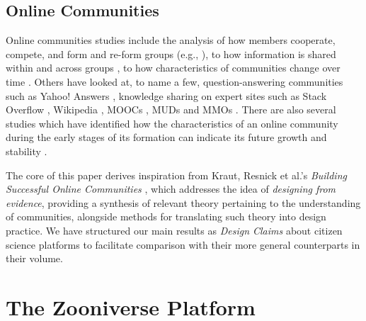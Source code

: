 \documentclass{sigchi}
\begin{document}
\begin{spacing}{0.97}
\subsection{Online Communities}
Online communities studies include the analysis of how members cooperate, compete, and form and re-form groups (e.g., \cite{Arguello2006}), to how information is shared within and across groups \cite{Krieger2009}, to how characteristics of communities change over time \cite{Kumar2006}. Others have looked at, to name a few, question-answering communities such as Yahoo! Answers \cite{Harper2009}, knowledge sharing on expert sites such as Stack Overflow \cite{vasilescu2013stackoverflow}, Wikipedia \cite{Kittur2008}, MOOCs \cite{milligan2013patterns}, MUDs \cite{bruckman1995mediamoo} and MMOs \cite{szell2010multirelational}. There are also several studies which have identified how the characteristics of an online community during the early stages of its formation can indicate its future growth and stability \cite{Kairam2012,Backstrom2006}.

The core of this paper derives inspiration from Kraut, Resnick et al.'s \emph{Building Successful Online Communities} \cite{kraut2012building}, which addresses the idea of \emph{designing from evidence}, providing a synthesis of relevant theory pertaining to the understanding of communities, alongside methods for translating such theory into design practice. We have structured our main results as \emph{Design Claims} about citizen science platforms to facilitate comparison with their more general counterparts in their volume. 

\section{The Zooniverse Platform}

\begin{spacing}{0.8}


\end{spacing}
\end{spacing}
\end{document}
